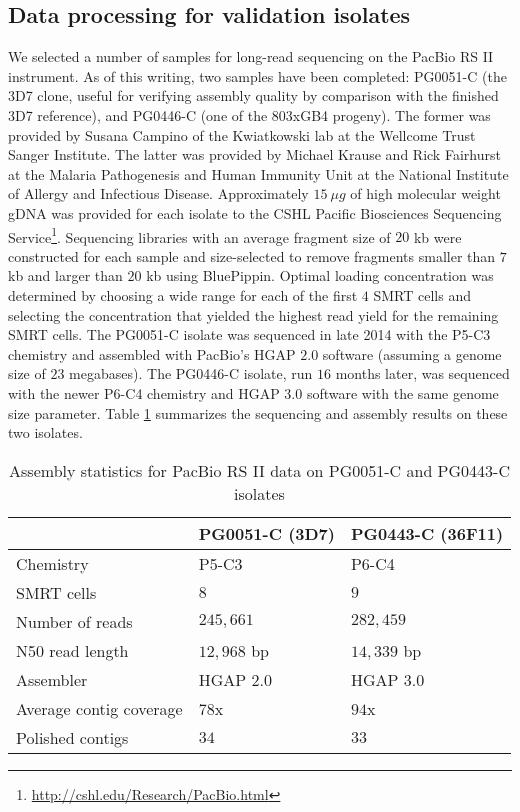 \subsection{Data processing for validation isolates}

We selected a number of samples for long-read sequencing on the PacBio RS II instrument.  As of this writing, two samples have been completed: PG0051-C (the 3D7 clone, useful for verifying assembly quality by comparison with the finished 3D7 reference), and PG0446-C (one of the 803xGB4 progeny).  The former was provided by Susana Campino of the Kwiatkowski lab at the Wellcome Trust Sanger Institute.  The latter was provided by Michael Krause and Rick Fairhurst at the Malaria Pathogenesis and Human Immunity Unit at the National Institute of Allergy and Infectious Disease.  Approximately $15~{\mu}g$ of high molecular weight gDNA was provided for each isolate to the CSHL Pacific Biosciences Sequencing Service\footnote{\url{http://cshl.edu/Research/PacBio.html}}.  Sequencing libraries with an average fragment size of $20$ kb were constructed for each sample and size-selected to remove fragments smaller than $7$ kb and larger than $20$ kb using BluePippin.  Optimal loading concentration was determined by choosing a wide range for each of the first $4$ SMRT cells and selecting the concentration that yielded the highest read yield for the remaining SMRT cells.  The PG0051-C isolate was sequenced in late 2014 with the P5-C3 chemistry and assembled with PacBio's HGAP $2.0$ software (assuming a genome size of $23$ megabases).  The PG0446-C isolate, run $16$ months later, was sequenced with the newer P6-C4 chemistry and HGAP $3.0$ software with the same genome size parameter.  Table \ref{tbl:asmstatspacbio} summarizes the sequencing and assembly results on these two isolates.

\begin{table}[]
\centering
\caption{Assembly statistics for PacBio RS II data on PG0051-C and PG0443-C isolates}
\label{tbl:asmstatspacbio}
\begin{tabular}{@{}lll@{}}
\toprule
                        & PG0051-C (3D7)   & PG0443-C (36F11)   \\ \midrule
Chemistry               & P5-C3            & P6-C4              \\
SMRT cells              & $8$              & $9$                \\
Number of reads         & $245,661$        & $282,459$          \\
N50 read length         & $12,968$ bp      & $14,339$ bp        \\
Assembler               & HGAP $2.0$       & HGAP $3.0$         \\
Average contig coverage & $78$x            & $94$x              \\
Polished contigs        & $34$             & $33$               \\ \bottomrule
\end{tabular}
\end{table}


